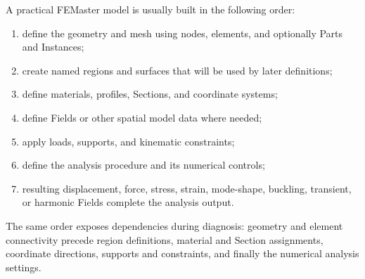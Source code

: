 A practical FEMaster model is usually built in the following order:
\begin{enumerate}
  \item define the geometry and mesh using nodes, elements, and optionally Parts and Instances;
  \item create named regions and surfaces that will be used by later definitions;
  \item define materials, profiles, Sections, and coordinate systems;
  \item define Fields or other spatial model data where needed;
  \item apply loads, supports, and kinematic constraints;
  \item define the analysis procedure and its numerical controls;
  \item resulting displacement, force, stress, strain, mode-shape, buckling, transient, or harmonic Fields complete the analysis output.
\end{enumerate}

The same order exposes dependencies during diagnosis: geometry and element connectivity precede region definitions, material and Section assignments, coordinate directions, supports and constraints, and finally the numerical analysis settings.
